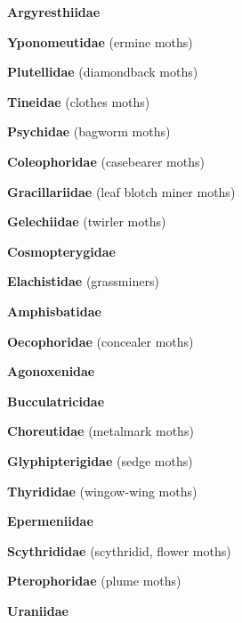 \documentclass[letterpaper,10pt]{article}
\begin{document}
{\makebox[0.6cm]{}  \textbf{Argyresthiidae} \par
\makebox[0.6cm]{}  \textbf{Yponomeutidae} (ermine moths) \par
\makebox[0.6cm]{}  \textbf{Plutellidae} (diamondback moths) \par
\makebox[0.6cm]{}  \textbf{Tineidae} (clothes moths) \par
\makebox[0.6cm]{}  \textbf{Psychidae} (bagworm moths) \par
\makebox[0.6cm]{}  \textbf{Coleophoridae} (casebearer moths) \par
\makebox[0.6cm]{}  \textbf{Gracillariidae} (leaf blotch miner moths) \par
\makebox[0.6cm]{}  \textbf{Gelechiidae} (twirler moths) \par
\makebox[0.6cm]{}  \textbf{Cosmopterygidae} \par
\makebox[0.6cm]{}  \textbf{Elachistidae} (grassminers) \par
\makebox[0.6cm]{}  \textbf{Amphisbatidae} \par
\makebox[0.6cm]{}  \textbf{Oecophoridae} (concealer moths) \par
\makebox[0.6cm]{}  \textbf{Agonoxenidae} \par
\makebox[0.6cm]{}  \textbf{Bucculatricidae} \par
\makebox[0.6cm]{}  \textbf{Choreutidae} (metalmark moths) \par
\makebox[0.6cm]{}  \textbf{Glyphipterigidae} (sedge moths) \par
\makebox[0.6cm]{}  \textbf{Thyrididae} (wingow-wing moths) \par
\makebox[0.6cm]{}  \textbf{Epermeniidae} \par
\makebox[0.6cm]{}  \textbf{Scythrididae} (scythridid, flower moths) \par
\makebox[0.6cm]{}  \textbf{Pterophoridae} (plume moths) \par
\makebox[0.6cm]{}  \textbf{Uraniidae} \par
}
\end{document}
